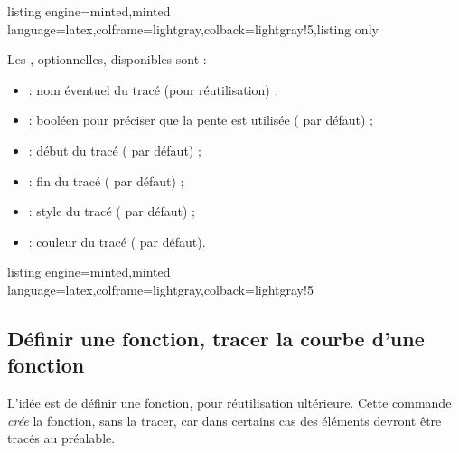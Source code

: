 \documentclass[11pt,a4paper]{ltxdoc}
\begin{document}
\begin{tcblisting}{listing engine=minted,minted language=latex,colframe=lightgray,colback=lightgray!5,listing only}
\end{tcblisting}

Les \MontreCode{[clés]}, optionnelles, disponibles sont :

\smallskip

\begin{itemize}
	\item {} : nom éventuel du tracé (pour réutilisation) ;
	\item {} : booléen pour préciser que la pente est utilisée ( par défaut) ;
	\item {} : début du tracé ( par défaut) ;
	\item {} : fin du tracé ( par défaut) ;
	\item {} : style du tracé ( par défaut) ;
	\item {} : couleur du tracé ( par défaut).
\end{itemize}

\begin{tcblisting}{listing engine=minted,minted language=latex,colframe=lightgray,colback=lightgray!5}
\begin{GraphiqueTikz}%
	[x=0.8cm,y=1cm,Xmin=-7,Xmax=4,Ymin=-3,Ymax=5]
\end{GraphiqueTikz}
\end{tcblisting}

\pagebreak

\subsection{Définir une fonction, tracer la courbe d'une fonction}\label{deftracfct}

L'idée est de définir une fonction, pour réutilisation ultérieure. Cette commande \textit{crée} la fonction, sans la tracer, car dans certains cas des éléments devront être tracés au préalable.
\end{document}

